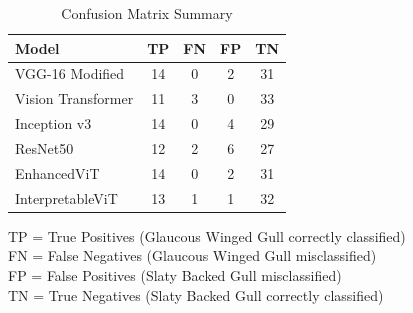 \documentclass[a4paper,12pt]{report}
\begin{document}


\begin{table}[htbp]
    \centering
    \caption{Confusion Matrix Summary}
    \label{tab:confusion_matrix}
    \begin{tabular}{lcccc}
    \toprule
    \textbf{Model} & \textbf{TP} & \textbf{FN} & \textbf{FP} & \textbf{TN} \\
    \midrule
    VGG-16 Modified & 14 & 0 & 2 & 31 \\
    Vision Transformer & 11 & 3 & 0 & 33 \\
    Inception v3 & 14 & 0 & 4 & 29 \\
    ResNet50 & 12 & 2 & 6 & 27 \\
    EnhancedViT & 14 & 0 & 2 & 31 \\
    InterpretableViT & 13 & 1 & 1 & 32 \\
    \bottomrule
    \end{tabular}
    \begin{flushleft}
    \footnotesize
    TP = True Positives (Glaucous Winged Gull correctly classified)\\
    FN = False Negatives (Glaucous Winged Gull misclassified)\\
    FP = False Positives (Slaty Backed Gull misclassified)\\
    TN = True Negatives (Slaty Backed Gull correctly classified)
    \end{flushleft}
\end{table}
\end{document}
